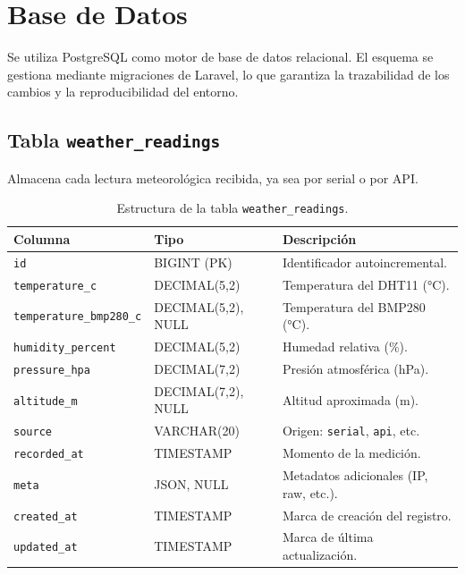 \documentclass[12pt,a4paper]{report}
\begin{document}
\section{Base de Datos}
\label{sec:base-datos}

Se utiliza PostgreSQL como motor de base de datos relacional. El esquema se gestiona mediante migraciones de Laravel, lo que garantiza la trazabilidad de los cambios y la reproducibilidad del entorno.

\subsection{Tabla \texttt{weather\_readings}}
\label{subsec:tabla-readings}

Almacena cada lectura meteorológica recibida, ya sea por serial o por API.

\begin{table}[H]
\centering
\caption{Estructura de la tabla \texttt{weather\_readings}.}
\label{tab:weather-readings}
\begin{tabular}{@{}llp{6cm}@{}}
\toprule
\textbf{Columna} & \textbf{Tipo} & \textbf{Descripción} \\
\midrule
\texttt{id} & BIGINT (PK) & Identificador autoincremental. \\
\texttt{temperature\_c} & DECIMAL(5,2) & Temperatura del DHT11 (°C). \\
\texttt{temperature\_bmp280\_c} & DECIMAL(5,2), NULL & Temperatura del BMP280 (°C). \\
\texttt{humidity\_percent} & DECIMAL(5,2) & Humedad relativa (\%). \\
\texttt{pressure\_hpa} & DECIMAL(7,2) & Presión atmosférica (hPa). \\
\texttt{altitude\_m} & DECIMAL(7,2), NULL & Altitud aproximada (m). \\
\texttt{source} & VARCHAR(20) & Origen: \texttt{serial}, \texttt{api}, etc. \\
\texttt{recorded\_at} & TIMESTAMP & Momento de la medición. \\
\texttt{meta} & JSON, NULL & Metadatos adicionales (IP, raw, etc.). \\
\texttt{created\_at} & TIMESTAMP & Marca de creación del registro. \\
\texttt{updated\_at} & TIMESTAMP & Marca de última actualización. \\
\bottomrule
\end{tabular}
\end{table}
\end{document}
